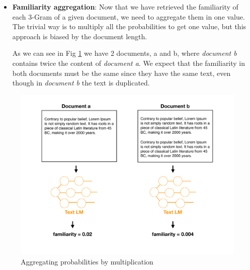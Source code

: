 \documentclass[12pt,mscthesis]{usiinfthesis}
\begin{document}
\begin{itemize}
	
		\item \textbf{Familiarity aggregation}: Now that we have retrieved the familiarity of each 3-Gram of a given document, we need to aggregate them in one value. The trivial way is to multiply all the probabilities to get one value, but this approach is biased by the document length.


		As we can see in Fig \ref{aggregation-by-multiplication} we have 2 documents, a and b, where \emph{document b} contains twice the content of \emph{document a}. We expect that the familiarity in both documents must be the same since they have the same text, even though in \emph{document b} the text is duplicated.\\ 
			\end{itemize}
		\begin{figure}[H]
			\centering
			\includegraphics[width=\textwidth]{aggregation-by-multiplication}
			\caption{Aggregating probabilities by multiplication}
			\label{aggregation-by-multiplication}
			\end{figure}
\end{document}
